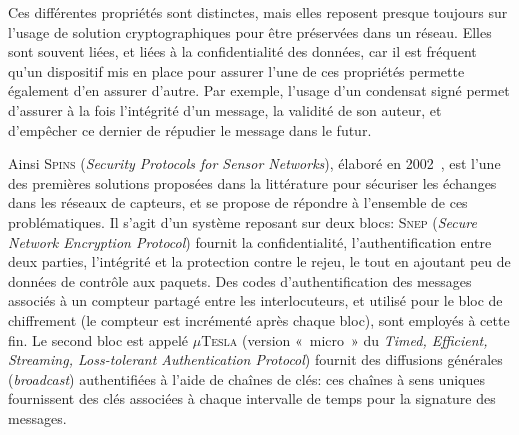 Ces différentes propriétés sont distinctes, mais elles reposent presque toujours sur l'usage de solution cryptographiques pour être préservées dans un réseau.
Elles sont souvent liées, et liées à la confidentialité des données, car il est fréquent qu'un dispositif mis en place pour assurer l'une de ces propriétés permette également d'en assurer d'autre.
Par exemple, l'usage d'un condensat signé permet d'assurer à la fois l'intégrité d'un message, la validité de son auteur, et d'empêcher ce dernier de répudier le message dans le futur.

Ainsi \textsc{Spins} (\textit{Security Protocols for Sensor Networks}), élaboré en 2002~\cite{PSWCT02}, est l'une des premières solutions proposées dans la littérature pour sécuriser les échanges dans les réseaux de capteurs, et se propose de répondre à l'ensemble de ces problématiques.
Il s'agit d'un système reposant sur deux blocs: \textsc{Snep} (\textit{Secure Network Encryption Protocol}) fournit la confidentialité, l'authentification entre deux parties, l'intégrité et la protection contre le rejeu, le tout en ajoutant peu de données de contrôle aux paquets.
Des codes d'authentification des messages associés à un compteur partagé entre les interlocuteurs, et utilisé pour le bloc de chiffrement (le compteur est incrémenté après chaque bloc), sont employés à cette fin.
Le second bloc est appelé $\mu$\textsc{Tesla} (version « micro » du \textit{Timed, Efficient, Streaming, Loss-tolerant Authentication Protocol}) fournit des diffusions générales (\textit{broadcast}) authentifiées à l'aide de chaînes de clés: ces chaînes à sens uniques fournissent des clés associées à chaque intervalle de temps pour la signature des messages.

